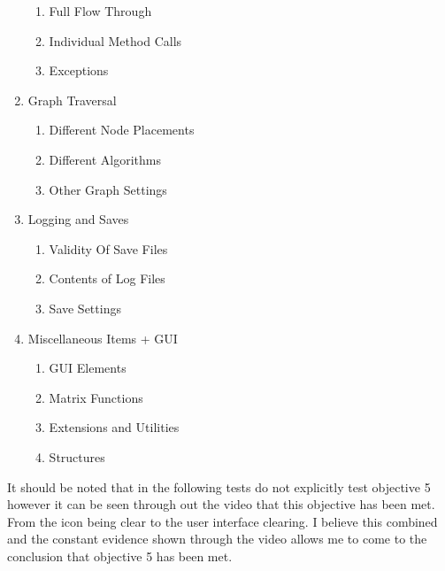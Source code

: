 \begin{flushleft}
\begin{enumerate}
\begin{enumerate}
            \item Full Flow Through
            \item Individual Method Calls
            \item Exceptions
        \end{enumerate}\bk
        \item Graph Traversal
        \begin{enumerate}
            \item Different Node Placements
            \item Different Algorithms
            \item Other Graph Settings
        \end{enumerate}\bk
        \item Logging and Saves
        \begin{enumerate}
            \item Validity Of Save Files
            \item Contents of Log Files
            \item Save Settings
        \end{enumerate}\bk
        \item Miscellaneous Items + GUI
        \begin{enumerate}
            \item GUI Elements
            \item Matrix Functions
            \item Extensions and Utilities 
            \item Structures
        \end{enumerate}
    \end{enumerate}
    \bk

    It should be noted that in the following tests do not explicitly test objective 5 however it can be seen through out the video that this objective has been met. From the icon being clear to the user interface clearing. I believe this combined and the constant evidence shown through the video allows me to come to the conclusion that objective 5 has been met.
    

    \bk
    \setlength\LTpre{0pt}


\end{flushleft}
